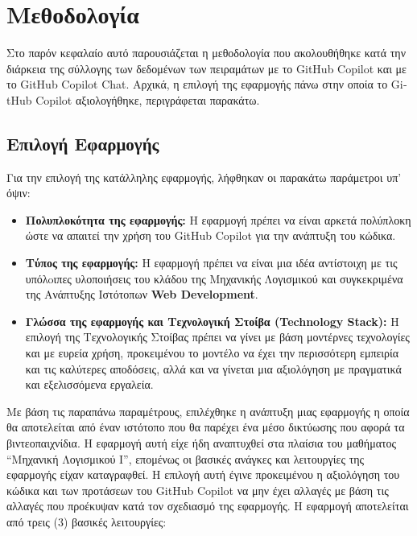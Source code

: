 \chapter{Μεθοδολογία}
\label{ch:chapter3}

Στο παρόν κεφαλαίο αυτό παρουσιάζεται η μεθοδολογία που ακολουθήθηκε
κατά την διάρκεια της σύλλογης των δεδομένων των πειραμάτων με το
\textlatin{GitHub Copilot} και με το \textlatin{GitHub Copilot Chat}.
Αρχικά, η επιλογή της εφαρμογής πάνω στην οποία το \textlatin{GitHub
  Copilot} αξιολογήθηκε, περιγράφεται παρακάτω.

\section{Επιλογή Εφαρμογής}

Για την επιλογή της κατάλληλης εφαρμογής, λήφθηκαν οι παρακάτω
παράμετροι υπ' όψιν:

\begin{itemize}
\item
  \textbf{Πολυπλοκότητα της εφαρμογής:} Η εφαρμογή πρέπει να είναι
  αρκετά πολύπλοκη ώστε να απαιτεί την χρήση του \textlatin{GitHub
    Copilot} για την ανάπτυξη του κώδικα.
\item
  \textbf{Τύπος της εφαρμογής:} Η εφαρμογή πρέπει να είναι μια ιδέα
  αντίστοιχη με τις υπόλoιπες υλοποιήσεις του κλάδου της Μηχανικής
  Λογισμικού και συγκεκριμένα της Ανάπτυξης Ιστότοπων
  \textlatin{\textbf{Web Development}}.
\item
  \textbf{Γλώσσα της εφαρμογής και Τεχνολογική Στοίβα
    (\textlatin{Technology Stack}):} Η επιλογή της Τεχνολογικής Στοίβας
  πρέπει να γίνει με βάση μοντέρνες τεχνολογίες και με ευρεία χρήση,
  προκειμένου το μοντέλο να έχει την περισσότερη εμπειρία και τις
  καλύτερες αποδόσεις, αλλά και να γίνεται μια αξιολόγηση με πραγματικά
  και εξελισσόμενα εργαλεία.
\end{itemize}

Με βάση τις παραπάνω παραμέτρους, επιλέχθηκε η ανάπτυξη μιας εφαρμογής η
οποία θα αποτελείται από έναν ιστότοπο που θα παρέχει ένα μέσο δικτύωσης
που αφορά τα βιντεοπαιχνίδια. Η εφαρμογή αυτή είχε ήδη αναπτυχθεί στα
πλαίσια του μαθήματος ``Μηχανική Λογισμικού Ι'', επομένως οι βασικές
ανάγκες και λειτουργίες της εφαρμογής είχαν καταγραφθεί. Η επιλογή αυτή
έγινε προκειμένου η αξιολόγηση του κώδικα και των προτάσεων του
\textlatin{GitHub Copilot} να μην έχει αλλαγές με βάση τις αλλαγές που
προέκυψαν κατά τον σχεδιασμό της εφαρμογής. Η εφαρμογή αποτελείται από
τρεις (3) βασικές λειτουργίες:

